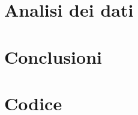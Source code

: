 \documentclass[11pt,a4paper]{article} %
\begin{document}
{\clearpage
\section{Analisi dei dati}
	

\section{Conclusioni}
	
	
\section{Codice}
} 	%

	
	
\end{document}
